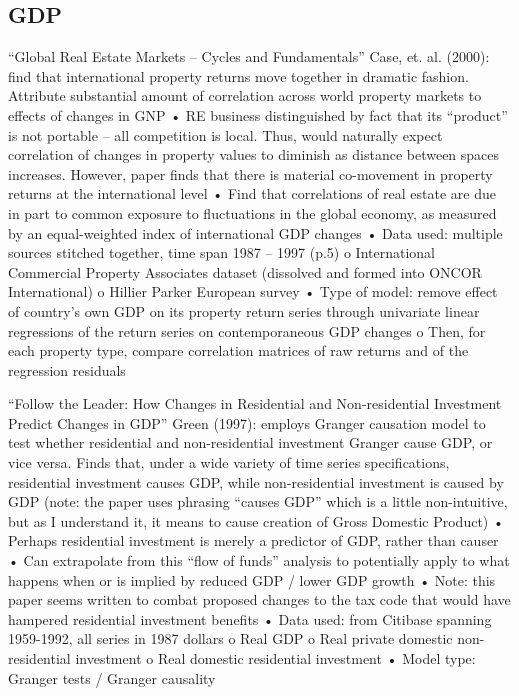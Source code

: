 \subsection{GDP}


“Global Real Estate Markets – Cycles and Fundamentals”
Case, et. al. (2000): find that international property returns move together in dramatic fashion. Attribute substantial amount of correlation across world property markets to effects of changes in GNP
•	RE business distinguished by fact that its “product” is not portable – all competition is local. Thus, would naturally expect correlation of changes in property values to diminish as distance between spaces increases. However, paper finds that there is material co-movement in property returns at the international level
•	Find that correlations of real estate are due in part to common exposure to fluctuations in the global economy, as measured by an equal-weighted index of international GDP changes
•	Data used: multiple sources stitched together, time span 1987 – 1997 (p.5)
o	International Commercial Property Associates dataset (dissolved and formed into ONCOR International) 
o	Hillier Parker European survey
•	Type of model: remove effect of country’s own GDP on its property return series through univariate linear regressions of the return series on contemporaneous GDP changes
o	Then, for each property type, compare correlation matrices of raw returns and of the regression residuals

“Follow the Leader: How Changes in Residential and Non-residential Investment Predict Changes in GDP”
Green (1997): employs Granger causation model to test whether residential and non-residential investment Granger cause GDP, or vice versa. Finds that, under a wide variety of time series specifications, residential investment causes GDP, while non-residential investment is caused by GDP (note: the paper uses phrasing “causes GDP” which is a little non-intuitive, but as I understand it, it means to cause creation of Gross Domestic Product)
•	Perhaps residential investment is merely a predictor of GDP, rather than causer
•	Can extrapolate from this “flow of funds” analysis to potentially apply to what happens when or is implied by reduced GDP / lower GDP growth
•	Note: this paper seems written to combat proposed changes to the tax code that would have hampered residential investment benefits
•	Data used: from Citibase spanning 1959-1992, all series in 1987 dollars
o	Real GDP
o	Real private domestic non-residential investment
o	Real domestic residential investment
•	Model type: Granger tests / Granger causality


